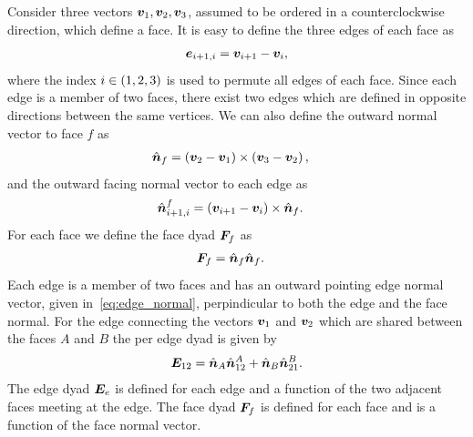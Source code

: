 \documentclass[]{aiaa-tc}%
\begin{document}
Consider three vectors \( \bm{v}_1, \bm{v}_2, \bm{v}_3 \), assumed to be ordered in a counterclockwise direction, which define a face.
It is easy to define the three edges of each face as
\begin{align}\label{eq:edges}
	\bm{e}_{i+1,i} = \bm{v}_{i+1} - \bm{v}_i ,
\end{align}
where the index \( i \in \left( 1,2,3 \right) \) is used to permute all edges of each face.
Since each edge is a member of two faces, there exist two edges which are defined in opposite directions between the same vertices.
We can also define the outward normal vector to face \( f\)  as
\begin{align}\label{eq:face_normal}
	\hat{\bm{n}}_f &= \left( \bm{v}_{2} - \bm{v}_1 \right) \times \left( \bm{v}_{3} - \bm{v}_2 \right) ,
\end{align}
and the outward facing normal vector to each edge as
\begin{align}\label{eq:edge_normal}
	\hat{\bm{n}}_{i+1,i}^f &= \left( \bm{v}_{i+1} - \bm{v}_i \right) \times \hat{\bm{n}}_f .
\end{align}
For each face we define the face dyad \( \bm{F}_f \) as
\begin{align}\label{eq:face_dyad}
	\bm{F}_f &= \hat{\bm{n}}_f \hat{\bm{n}}_f .
\end{align}
Each edge is a member of two faces and has an outward pointing edge normal vector, given in~\cref{eq:edge_normal}, perpindicular to both the edge and the face normal.
For the edge connecting the vectors \( \bm{v}_1 \) and \( \bm{v}_2 \) which are shared between the faces \(A\) and \( B\) the per edge dyad is given by
\begin{align}\label{eq:edge_dyad}
	\bm{E}_{12} = \hat{\bm{n}}_A \hat{\bm{n}}_{12}^A + \hat{\bm{n}}_B \hat{\bm{n}}_{21}^B .
\end{align}
The edge dyad \( \bm{E}_e \) is defined for each edge and a function of the two adjacent faces meeting at the edge.
The face dyad \( \bm{F}_f \) is defined for each face and is a function of the face normal vector.
\end{document}
